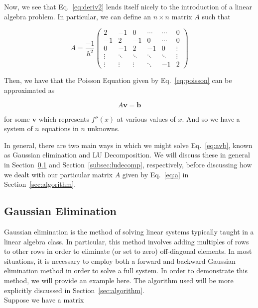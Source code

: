 \documentclass[12pt]{article}
\numberwithin{equation}{section}
\begin{document}
\noindent Now, we see that Eq.~\ref{eq:deriv2} lends itself nicely to the introduction of a linear algebra problem.  In particular, we can define an $n\times n$ matrix $A$ such that

\begin{equation}
\label{eq:a}
A = \frac{-1}{h^{2}} \left(
\begin{array}{cccccc}
2 & -1 & 0 & \cdots & \cdots & 0 \\
-1 & 2 & -1 & 0 & \cdots & 0 \\
0 & -1 & 2 & -1 & 0 & \vdots \\
\vdots & \ddots & \ddots & \ddots & \ddots & \vdots \\
\vdots & \vdots & \vdots & \ddots & -1 & 2
\end{array}
\right)
\end{equation}

\noindent Then, we have that the Poisson Equation given by Eq.~\ref{eq:poisson} can be approximated as 

\begin{equation}
\label{eq:avb}
A\textbf{v}=\textbf{b}
\end{equation}

\noindent for some $\textbf{v}$ which represents $f''\left(x\right)$ at various values of $x$.  And so we have a system of $n$ equations in $n$ unknowns.

In general, there are two main ways in which we might solve  Eq.~\ref{eq:avb}, known as Gaussian elimination and LU Decomposition.  We will discuss these in general in Section~\ref{subsec:gausselim} and Section~\ref{subsec:ludecomp}, respectively, before discussing how we dealt with our particular matrix $A$ given by Eq.~\ref{eq:a} in Section~\ref{sec:algorithm}.

\subsection{Gaussian Elimination}
\label{subsec:gausselim}

Gaussian elimination is the method of solving linear systems typically taught in a linear algebra class.  In particular, this method involves adding multiples of rows to other rows in order to eliminate (or set to zero) off-diagonal elements.  In most situations, it is necessary to employ both a forward and backward Gaussian elimination method in order to solve a full system.  In order to demonstrate this method, we will provide an example here.  The algorithm used will be more explicitly discussed in Section~\ref{sec:algorithm}.
\\\indent Suppose we have a matrix 
\end{document}
